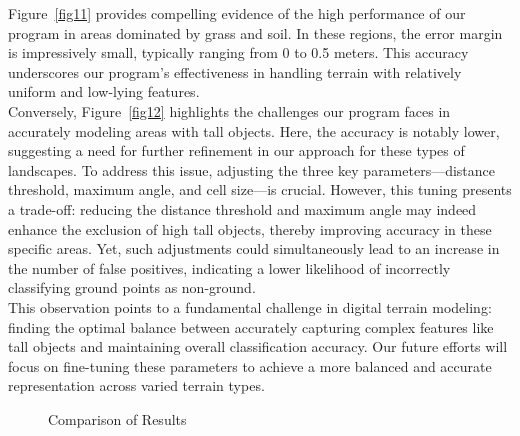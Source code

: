 \documentclass{article}
\begin{document}
\noindent Figure~\ref{fig11} provides compelling evidence of the high performance of our program in areas dominated by grass and soil. In these regions, the error margin is impressively small, typically ranging from 0 to 0.5 meters. This accuracy underscores our program's effectiveness in handling terrain with relatively uniform and low-lying features.\\

\noindent Conversely, Figure~\ref{fig12} highlights the challenges our program faces in accurately modeling areas with tall objects. Here, the accuracy is notably lower, suggesting a need for further refinement in our approach for these types of landscapes. To address this issue, adjusting the three key parameters—distance threshold, maximum angle, and cell size—is crucial. However, this tuning presents a trade-off: reducing the distance threshold and maximum angle may indeed enhance the exclusion of high tall objects, thereby improving accuracy in these specific areas. Yet, such adjustments could simultaneously lead to an increase in the number of false positives, indicating a lower likelihood of incorrectly classifying ground points as non-ground.\\

\noindent This observation points to a fundamental challenge in digital terrain modeling: finding the optimal balance between accurately capturing complex features like tall objects and maintaining overall classification accuracy. Our future efforts will focus on fine-tuning these parameters to achieve a more balanced and accurate representation across varied terrain types.\\




\begin{figure}[H]
    \centering
    \hspace{0.5cm}
    \caption{Comparison of Results}
    \label{fig:comparison}
\end{figure}
\end{document}
